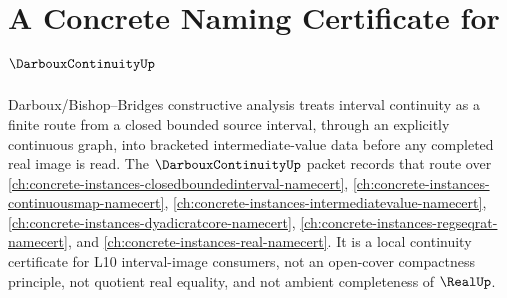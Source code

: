 \chapter{A Concrete Naming Certificate for $\DarbouxContinuityUp$}
\label{ch:concrete-instances-darboux-continuity-namecert}

Darboux/Bishop--Bridges constructive analysis treats interval continuity as a finite route from a closed bounded source interval, through an explicitly continuous graph, into bracketed intermediate-value data before any completed real image is read. The $\DarbouxContinuityUp$ packet records that route over \autoref{ch:concrete-instances-closedboundedinterval-namecert}, \autoref{ch:concrete-instances-continuousmap-namecert}, \autoref{ch:concrete-instances-intermediatevalue-namecert}, \autoref{ch:concrete-instances-dyadicratcore-namecert}, \autoref{ch:concrete-instances-regseqrat-namecert}, and \autoref{ch:concrete-instances-real-namecert}. It is a local continuity certificate for L10 interval-image consumers, not an open-cover compactness principle, not quotient real equality, and not ambient completeness of $\RealUp$.

